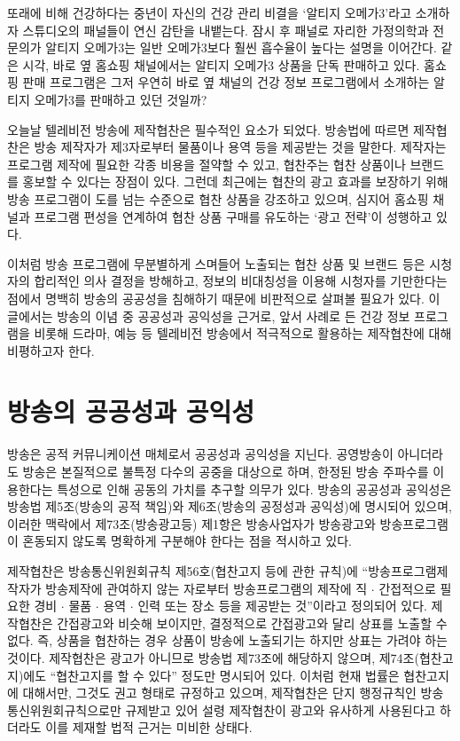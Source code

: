 \maketitle

또래에 비해 건강하다는 중년이 자신의 건강 관리 비결을 `알티지 오메가3'라고 소개하자 스튜디오의 패널들이 연신 감탄을 내뱉는다. 잠시 후 패널로 자리한 가정의학과 전문의가 알티지 오메가3는 일반 오메가3보다 훨씬 흡수율이 높다는 설명을 이어간다. 같은 시각, 바로 옆 홈쇼핑 채널에서는 알티지 오메가3 상품을 단독 판매하고 있다. 홈쇼핑 판매 프로그램은 그저 우연히 바로 옆 채널의 건강 정보 프로그램에서 소개하는 알티지 오메가3를 판매하고 있던 것일까?

오늘날 텔레비전 방송에 제작협찬은 필수적인 요소가 되었다. 방송법에 따르면 제작협찬은 방송 제작자가 제3자로부터 물품이나 용역 등을 제공받는 것을 말한다. 제작자는 프로그램 제작에 필요한 각종 비용을 절약할 수 있고, 협찬주는 협찬 상품이나 브랜드를 홍보할 수 있다는 장점이 있다. 그런데 최근에는 협찬의 광고 효과를 보장하기 위해 방송 프로그램이 도를 넘는 수준으로 협찬 상품을 강조하고 있으며, 심지어 홈쇼핑 채널과 프로그램 편성을 연계하여 협찬 상품 구매를 유도하는 `광고 전략'이 성행하고 있다.

이처럼 방송 프로그램에 무분별하게 스며들어 노출되는 협찬 상품 및 브랜드 등은 시청자의 합리적인 의사 결정을 방해하고, 정보의 비대칭성을 이용해 시청자를 기만한다는 점에서 명백히 방송의 공공성을 침해하기 때문에 비판적으로 살펴볼 필요가 있다. 이 글에서는 방송의 이념 중 공공성과 공익성을 근거로, 앞서 사례로 든 건강 정보 프로그램을 비롯해 드라마, 예능 등 텔레비전 방송에서 적극적으로 활용하는 제작협찬에 대해 비평하고자 한다.

\section*{방송의 공공성과 공익성}

방송은 공적 커뮤니케이션 매체로서 공공성과 공익성을 지닌다. 공영방송이 아니더라도 방송은 본질적으로 불특정 다수의 공중을 대상으로 하며, 한정된 방송 주파수를 이용한다는 특성으로 인해 공동의 가치를 추구할 의무가 있다. 방송의 공공성과 공익성은 방송법 제5조(방송의 공적 책임)와 제6조(방송의 공정성과 공익성)에 명시되어 있으며, 이러한 맥락에서 제73조(방송광고등) 제1항은 방송사업자가 방송광고와 방송프로그램이 혼동되지 않도록 명확하게 구분해야 한다는 점을 적시하고 있다.

제작협찬은 방송통신위원회규칙 제56호(협찬고지 등에 관한 규칙)에 ``방송프로그램제작자가 방송제작에 관여하지 않는 자로부터 방송프로그램의 제작에 직 $\cdot$ 간접적으로 필요한 경비 $\cdot$ 물품 $\cdot$ 용역 $\cdot$ 인력 또는 장소 등을 제공받는 것''이라고 정의되어 있다. 제작협찬은 간접광고와 비슷해 보이지만, 결정적으로 간접광고와 달리 상표를 노출할 수 없다. 즉, 상품을 협찬하는 경우 상품이 방송에 노출되기는 하지만 상표는 가려야 하는 것이다. 제작협찬은 광고가 아니므로 방송법 제73조에 해당하지 않으며, 제74조(협찬고지)에도 ``협찬고지를 할 수 있다'' 정도만 명시되어 있다. 이처럼 현재 법률은 협찬고지에 대해서만, 그것도 권고 형태로 규정하고 있으며, 제작협찬은 단지 행정규칙인 방송통신위원회규칙으로만 규제받고 있어 설령 제작협찬이 광고와 유사하게 사용된다고 하더라도 이를 제재할 법적 근거는 미비한 상태다.

